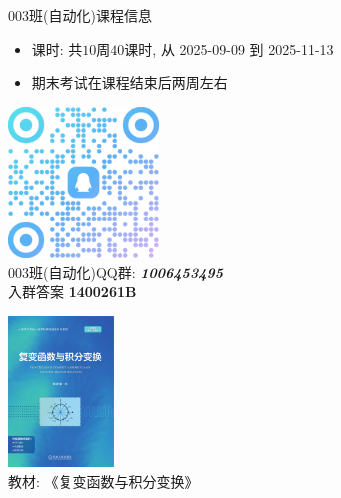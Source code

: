 \begin{frame}[<*>]{003班(自动化)课程信息}
	\begin{itemize}
		\item 课时: 共$10$周$40$课时, 从 2025-09-09 到 2025-11-13
		\item 期末考试在课程结束后两周左右
	\end{itemize}
	\begin{twopart}{180pt}
		\begin{center}
			\includegraphics[height=40mm]{../image/003.png}\\
			003班(自动化)QQ群: \emph{\textbf{1006453495}}\\
			入群答案 \alert{\textbf{1400261B}}
		\end{center}
		\tcblower
		\begin{center}
			\includegraphics[height=40mm]{../image/book.png}\\
			教材: 《复变函数与积分变换》
		\end{center}
	\end{twopart}
\end{frame}


